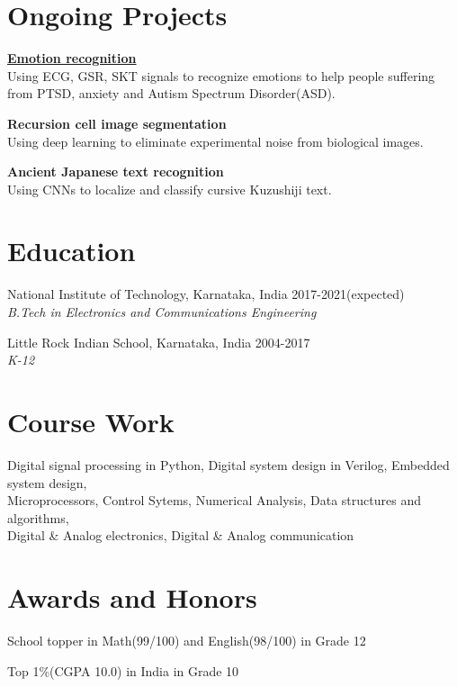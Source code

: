 \documentclass[letterpaper]{article}
\renewenvironment{itemize}{
  \begin{list}{}{
    \setlength{\leftmargin}{1.5em}
  }
}{
  \end{list}
}
\begin{document}
\section*{Ongoing Projects}
  \begin{itemize}
    \item
    \href{https://github.com/rshwndsz/emotion-recognition}{\textbf{Emotion recognition}}\\
    Using ECG, GSR, SKT signals to recognize emotions to help people suffering from PTSD, anxiety and Autism Spectrum Disorder(ASD).
    \item
    \textbf{Recursion cell image segmentation}\\
    Using deep learning to eliminate experimental noise from biological images.
    \item
    \textbf{Ancient Japanese text recognition}\\
    Using CNNs to localize and classify cursive Kuzushiji text.
  \end{itemize}

\section*{Education}
  \begin{itemize}
    \item National Institute of Technology, Karnataka, India\hfill 
    2017-2021(expected)
    \\
    {\sl B.Tech in Electronics and Communications Engineering}

    \item Little Rock Indian School, Karnataka, India\hfill
    2004-2017
    \\
    {\sl K-12}\hfill
  \end{itemize}

\section*{Course Work}
  Digital signal processing in Python, Digital system design in Verilog, Embedded system design, \\
  Microprocessors, Control Sytems, Numerical Analysis, Data structures and algorithms, \\
  Digital \& Analog electronics, Digital \& Analog communication

\section*{Awards and Honors}
\begin{itemize}
  \item School topper in Math(99/100) and English(98/100) in Grade 12
  \item Top 1\%(CGPA 10.0) in India in Grade 10
\end{itemize}
\end{document}
